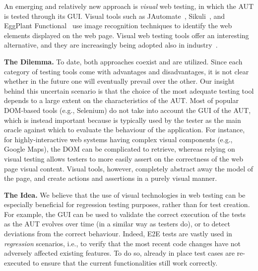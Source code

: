 An emerging and relatively new approach is \textit{visual} web testing, in which the AUT is tested through its GUI. 
Visual tools such as JAutomate~\cite{Alegroth2013jat}, Sikuli~\cite{Sikuli}, and EggPlant Functional~\cite{eggplant} use image recognition techniques to identify the web elements displayed on the web page. Visual web testing tools offer an interesting alternative, and they are increasingly being adopted also in industry~\cite{Alegroth2013jat}. 

\noindent
\textbf{The Dilemma.}
To date, both approaches coexist and are utilized. Since each category of testing tools come with advantages and disadvantages, it is not clear whether in the future one will eventually prevail over the other. Our insight behind this uncertain scenario is that the choice of the most adequate testing tool depends to a large extent on the characteristics of the AUT. 
Most of popular DOM-based tools (e.g., Selenium) do not take into account the GUI of the AUT, which is instead important because is typically used by the tester as the main oracle against which to evaluate the behaviour of the application. %
For instance, for highly-interactive web systems having complex visual components (e.g., Google Maps), the DOM can be complicated to retrieve, whereas relying on visual testing allows testers to more easily assert on the correctness of the web page visual content. Visual tools, however, completely abstract away the model of the page, and create actions and assertions in a purely visual manner. 

\noindent
\textbf{The Idea.}
We believe that the use of visual technologies in web testing can  be especially beneficial for regression testing purposes, rather than for test creation. For example, the GUI can be used to validate the correct execution of the tests as the AUT evolves over time (in a similar way as testers do), or to detect deviations from the correct behaviour.
Indeed, E2E tests are vastly used in \textit{regression} scenarios, i.e., to verify that the most recent code changes have not adversely affected existing features. To do so, already in place test cases are re-executed to ensure that the current functionalities still work correctly. 
%

